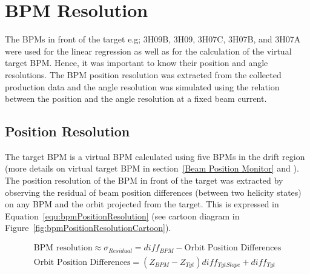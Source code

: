\section{BPM Resolution}
\label{BPM Resolution}

The BPMs in front of the target e.g; 3H09B, 3H09, 3H07C, 3H07B, and 3H07A were used for the linear regression as well as for the calculation of the virtual target BPM.  Hence, it was important to know their position and angle resolutions. The BPM position resolution was extracted from the collected production data and the angle resolution was simulated using the relation between the position and the angle resolution at a fixed beam current.

\subsection{Position Resolution}
\label{Position Resolution}
The target BPM is a virtual BPM calculated using five BPMs in the drift region (more details on virtual target BPM in section~\ref{Beam Position Monitor} and \cite{buddhini_qweak}). The position resolution of the BPM in front of the target was extracted by observing the residual of beam position differences (between two helicity states) on any BPM and the orbit projected from the target. This is expressed in Equation~\ref{equ:bpmPositionResolution} (see cartoon diagram in Figure~\ref{fig:bpmPositionResolutionCartoon}). 

\begin{equation} \label{equ:bpmPositionResolution}
\begin{split}
\text{BPM resolution} \approx \sigma_{Residual} = diff_{BPM} - \text{Orbit Position Differences} \\
\text{Orbit Position Differences} = (Z_{BPM} - Z_{Tgt}) diff_{TgtSlope} + diff_{Tgt}
\end{split}
\end{equation}



